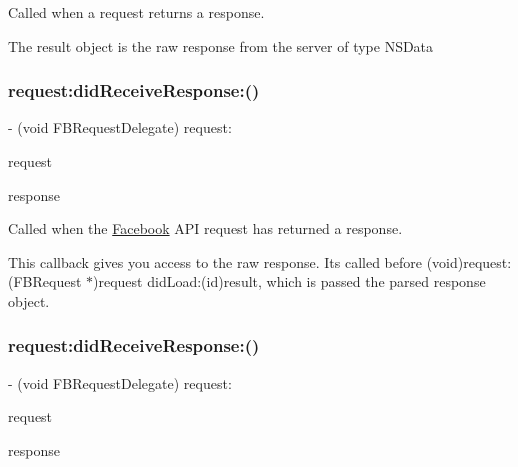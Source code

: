 Called when a request returns a response.

The result object is the raw response from the server of type N\+S\+Data \mbox{\label{protocolFBRequestDelegate_01-p_a033e79b42f446a538a1a5801a67977b4}} 
\subsubsection{\texorpdfstring{request\+:did\+Receive\+Response\+:()}{request:didReceiveResponse:()}\hspace{0.1cm}{\footnotesize\ttfamily [1/2]}}
{\footnotesize\ttfamily -\/ (void F\+B\+Request\+Delegate) request\+: \begin{DoxyParamCaption}\item[{(\hyperlink{interfaceFBRequest}{F\+B\+Request} $\ast$)}]{request }\item[{didReceiveResponse:(N\+S\+U\+R\+L\+Response $\ast$)}]{response }\end{DoxyParamCaption}\hspace{0.3cm}{\ttfamily [optional]}}

Called when the \hyperlink{interfaceFacebook}{Facebook} A\+PI request has returned a response.

This callback gives you access to the raw response. It\textquotesingle{}s called before (void)request\+:(\+F\+B\+Request $\ast$)request did\+Load\+:(id)result, which is passed the parsed response object. \mbox{\label{protocolFBRequestDelegate_01-p_a033e79b42f446a538a1a5801a67977b4}} 
\subsubsection{\texorpdfstring{request\+:did\+Receive\+Response\+:()}{request:didReceiveResponse:()}\hspace{0.1cm}{\footnotesize\ttfamily [2/2]}}
{\footnotesize\ttfamily -\/ (void F\+B\+Request\+Delegate) request\+: \begin{DoxyParamCaption}\item[{(\hyperlink{interfaceFBRequest}{F\+B\+Request} $\ast$)}]{request }\item[{didReceiveResponse:(N\+S\+U\+R\+L\+Response $\ast$)}]{response }\end{DoxyParamCaption}\hspace{0.3cm}{\ttfamily [optional]}}

